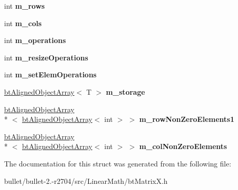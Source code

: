 \begin{DoxyCompactItemize}
\item 
\hypertarget{structbt_matrix_x_af26e15412e9b148580d5bb69be3cb0ae}{int {\bfseries m\+\_\+rows}}\label{structbt_matrix_x_af26e15412e9b148580d5bb69be3cb0ae}

\item 
\hypertarget{structbt_matrix_x_a2d8a0f250132b3bca108146a45c69e8a}{int {\bfseries m\+\_\+cols}}\label{structbt_matrix_x_a2d8a0f250132b3bca108146a45c69e8a}

\item 
\hypertarget{structbt_matrix_x_ae3dc972f13cbd0917f0dd8693c17c062}{int {\bfseries m\+\_\+operations}}\label{structbt_matrix_x_ae3dc972f13cbd0917f0dd8693c17c062}

\item 
\hypertarget{structbt_matrix_x_aaad2b4383ec7c102109376c4b826a09c}{int {\bfseries m\+\_\+resize\+Operations}}\label{structbt_matrix_x_aaad2b4383ec7c102109376c4b826a09c}

\item 
\hypertarget{structbt_matrix_x_aa5083cc556cce608dfa81e327ebc7346}{int {\bfseries m\+\_\+set\+Elem\+Operations}}\label{structbt_matrix_x_aa5083cc556cce608dfa81e327ebc7346}

\item 
\hypertarget{structbt_matrix_x_a187a6837af537ccb19a0edbcdd82fb42}{\hyperlink{classbt_aligned_object_array}{bt\+Aligned\+Object\+Array}$<$ T $>$ {\bfseries m\+\_\+storage}}\label{structbt_matrix_x_a187a6837af537ccb19a0edbcdd82fb42}

\item 
\hypertarget{structbt_matrix_x_adc2952ecfab5a301259045e80f1c5d3f}{\hyperlink{classbt_aligned_object_array}{bt\+Aligned\+Object\+Array}\\*
$<$ \hyperlink{classbt_aligned_object_array}{bt\+Aligned\+Object\+Array}$<$ int $>$ $>$ {\bfseries m\+\_\+row\+Non\+Zero\+Elements1}}\label{structbt_matrix_x_adc2952ecfab5a301259045e80f1c5d3f}

\item 
\hypertarget{structbt_matrix_x_a3dd224a448cb760c969d4405ee148494}{\hyperlink{classbt_aligned_object_array}{bt\+Aligned\+Object\+Array}\\*
$<$ \hyperlink{classbt_aligned_object_array}{bt\+Aligned\+Object\+Array}$<$ int $>$ $>$ {\bfseries m\+\_\+col\+Non\+Zero\+Elements}}\label{structbt_matrix_x_a3dd224a448cb760c969d4405ee148494}

\end{DoxyCompactItemize}


The documentation for this struct was generated from the following file\+:\begin{DoxyCompactItemize}
\item 
bullet/bullet-\/2.-\/r2704/src/\+Linear\+Math/bt\+Matrix\+X.\+h\end{DoxyCompactItemize}
